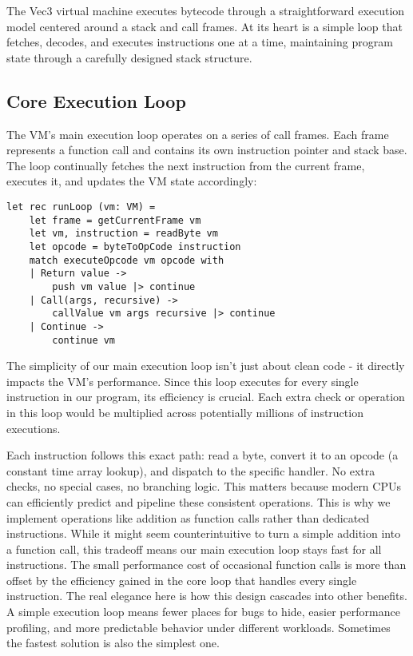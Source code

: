 The Vec3 virtual machine executes bytecode through a straightforward execution model centered around a stack and call frames.
At its heart is a simple loop that fetches, decodes, and executes instructions one at a time, maintaining program 
state through a carefully designed stack structure\citet{Nystrom:2021}.

\subsection{Core Execution Loop}\label{subsec:core-execution-loop}

The VM's main execution loop operates on a series of call frames.
Each frame represents a function call and contains its own instruction pointer and stack base.
The loop continually fetches the next instruction from the current frame, executes it, and updates the VM state accordingly:

\begin{verbatim}
let rec runLoop (vm: VM) =
    let frame = getCurrentFrame vm
    let vm, instruction = readByte vm
    let opcode = byteToOpCode instruction
    match executeOpcode vm opcode with
    | Return value -> 
        push vm value |> continue
    | Call(args, recursive) ->
        callValue vm args recursive |> continue
    | Continue -> 
        continue vm
\end{verbatim}

The simplicity of our main execution loop isn't just about clean code - it directly impacts the VM's performance.
Since this loop executes for every single instruction in our program, its efficiency is crucial.
Each extra check or operation in this loop would be multiplied across potentially millions of instruction executions.

Each instruction follows this exact path: read a byte, convert it to an opcode (a constant time array lookup), and dispatch to the specific handler.
No extra checks, no special cases, no branching logic.
This matters because modern CPUs can efficiently predict and pipeline these consistent operations\citet{7569243}.
This is why we implement operations like addition as function calls rather than dedicated instructions.
While it might seem counterintuitive to turn a simple addition into a function call, this tradeoff means our main execution loop stays fast for all instructions.
The small performance cost of occasional function calls is more than offset by the efficiency gained in the core loop that handles every single instruction.
The real elegance here is how this design cascades into other benefits.
A simple execution loop means fewer places for bugs to hide, easier performance profiling, and more predictable behavior under different workloads.
Sometimes the fastest solution is also the simplest one.

